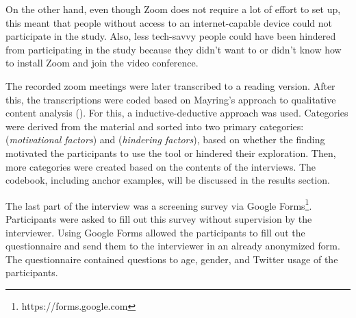 On the other hand, even though Zoom does not require a lot of effort to set up, this meant that people without access to an internet-capable device could not participate in the study. Also, less tech-savvy people could have been hindered from participating in the study because they didn't want to or didn't know how to install Zoom and join the video conference.

The recorded zoom meetings were later transcribed to a reading version. After this, the transcriptions were coded based on Mayring's approach to qualitative content analysis (\cite{mayring2010qualitative}). For this, a inductive-deductive approach was used. Categories were derived from the material and sorted into two primary categories:  (\emph{motivational factors}) and  (\emph{hindering factors}), based on whether the finding motivated the participants to use the tool or hindered their exploration. Then, more categories were created based on the contents of the interviews. The codebook, including anchor examples, will be discussed in the results section. 

The last part of the interview was a screening survey via Google Forms\footnote{https://forms.google.com}. Participants were asked to fill out this survey without supervision by the interviewer. Using Google Forms allowed the participants to fill out the questionnaire and send them to the interviewer in an already anonymized form. The questionnaire contained questions to age, gender, and Twitter usage of the participants.
